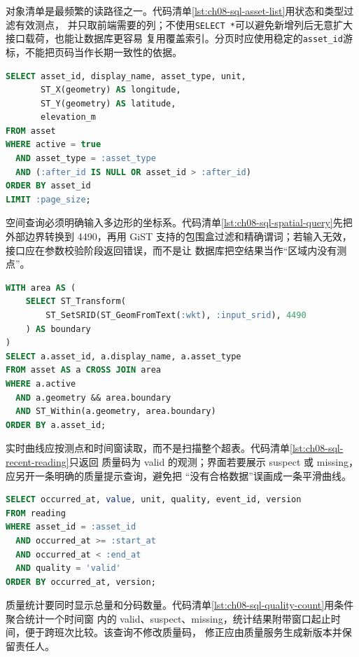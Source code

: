 对象清单是最频繁的读路径之一。代码清单\ref{lst:ch08-sql-asset-list}用状态和类型过滤有效测点，
并只取前端需要的列；不使用\texttt{SELECT *}可以避免新增列后无意扩大接口载荷，也能让数据库更容易
复用覆盖索引。分页时应使用稳定的\texttt{asset\_id}游标，不能把页码当作长期一致性的依据。

\begin{lstlisting}[label={lst:ch08-sql-asset-list},language=SQL,caption={按类型和状态读取测点清单}]
SELECT asset_id, display_name, asset_type, unit,
       ST_X(geometry) AS longitude,
       ST_Y(geometry) AS latitude,
       elevation_m
FROM asset
WHERE active = true
  AND asset_type = :asset_type
  AND (:after_id IS NULL OR asset_id > :after_id)
ORDER BY asset_id
LIMIT :page_size;
\end{lstlisting}

空间查询必须明确输入多边形的坐标系。代码清单\ref{lst:ch08-sql-spatial-query}先把外部边界转换到
4490，再用 GiST 支持的包围盒过滤和精确谓词；若输入无效，接口应在参数校验阶段返回错误，而不是让
数据库把空结果当作“区域内没有测点”。

\begin{lstlisting}[label={lst:ch08-sql-spatial-query},language=SQL,caption={影响区内测点的空间查询}]
WITH area AS (
    SELECT ST_Transform(
        ST_SetSRID(ST_GeomFromText(:wkt), :input_srid), 4490
    ) AS boundary
)
SELECT a.asset_id, a.display_name, a.asset_type
FROM asset AS a CROSS JOIN area
WHERE a.active
  AND a.geometry && area.boundary
  AND ST_Within(a.geometry, area.boundary)
ORDER BY a.asset_id;
\end{lstlisting}

实时曲线应按测点和时间窗读取，而不是扫描整个超表。代码清单\ref{lst:ch08-sql-recent-reading}只返回
质量码为 valid 的观测；界面若要展示 suspect 或 missing，应另开一条明确的质量提示查询，避免把
“没有合格数据”误画成一条平滑曲线。

\begin{lstlisting}[label={lst:ch08-sql-recent-reading},language=SQL,caption={按时间窗读取有效观测}]
SELECT occurred_at, value, unit, quality, event_id, version
FROM reading
WHERE asset_id = :asset_id
  AND occurred_at >= :start_at
  AND occurred_at < :end_at
  AND quality = 'valid'
ORDER BY occurred_at, version;
\end{lstlisting}

质量统计要同时显示总量和分码数量。代码清单\ref{lst:ch08-sql-quality-count}用条件聚合统计一个时间窗
内的 valid、suspect、missing，统计结果附带窗口起止时间，便于跨班次比较。该查询不修改质量码，
修正应由质量服务生成新版本并保留责任人。

